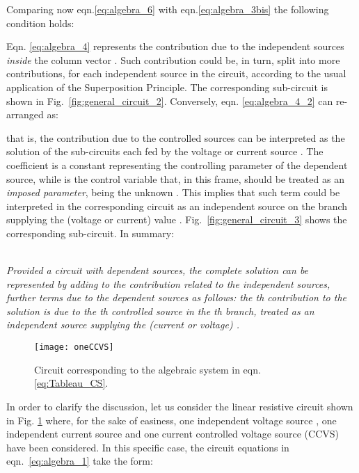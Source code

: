 \documentclass[10pt]{amsart}
\begin{document}
Comparing  now eqn.\eqref{eq:algebra_6} with eqn.\eqref{eq:algebra_3bis} the following condition holds:

Eqn. \eqref{eq:algebra_4} represents the contribution due to the independent sources \emph{inside} the column vector . Such contribution could be, in turn, split into more contributions, for each independent source in the circuit, according to the usual application of the Superposition Principle. The corresponding sub-circuit is shown in Fig.~\ref{fig:general_circuit_2}. Conversely, eqn. \eqref{eq:algebra_4_2} can re-arranged as:

that is, the contribution due to the controlled sources can be interpreted as the solution of the sub-circuits each fed by the voltage or current source . The coefficient  is a constant representing the controlling parameter of the dependent source, while  is the control variable that, in this frame, should be treated as an \emph{imposed parameter}, being the unknown . This implies that such term could be interpreted in the corresponding circuit as an independent source on the  branch supplying the (voltage or current) value . Fig.~\ref{fig:general_circuit_3} shows the corresponding sub-circuit. In summary:
\\\\
\begin{small}
\textsl{Provided a circuit with  \emph{dependent sources}, the complete solution can be represented by adding to the contribution related to the \emph{independent sources},  further terms due to the \emph{dependent sources} as follows: the th contribution to the solution is due to the th controlled source in the th branch, treated as an independent source supplying the (current or voltage) .
}\end{small}
\begin{figure}[h]
\centering
\texttt{[image: oneCCVS]}
\caption{Circuit corresponding to the algebraic system in eqn. \eqref{eq:Tableau_CS}.}
\label{fig:CS1_ex}
\end{figure}


In order to clarify the discussion, let us consider the linear resistive circuit shown in Fig. \ref{fig:CS1_ex} where, for the sake of easiness, one independent voltage source , one independent current source   and one current controlled voltage source (CCVS) have been considered. In this specific case, the circuit equations in eqn.~\eqref{eq:algebra_1} take the form:


\\
\end{document}
